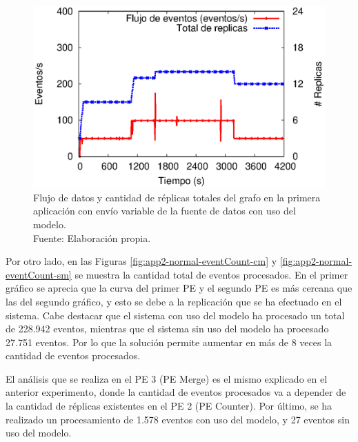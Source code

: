 \begin{figure}[!ht]
	\centering
	\captionsetup{justification=centering}
	\includegraphics[scale=0.7]{images/exp/app2/normal/cm/processSystem.eps}
    \caption[Flujo de datos y cantidad de réplicas totales del grafo en la primera aplicación con envío variable de la fuente de datos con uso del modelo.]{Flujo de datos y cantidad de réplicas totales del grafo en la primera aplicación con envío variable de la fuente de datos con uso del modelo.\\Fuente: Elaboración propia.}
	\label{fig:app2-normal-processSystem-cm}
\end{figure}


Por otro lado, en las Figuras \ref{fig:app2-normal-eventCount-cm} y \ref{fig:app2-normal-eventCount-sm} se muestra la cantidad total de eventos procesados. En el primer gráfico se aprecia que la curva del primer PE y el segundo PE es más cercana que las del segundo gráfico, y esto se debe a la replicación que se ha efectuado en el sistema. Cabe destacar que el sistema con uso del modelo ha procesado un total de 228.942 eventos, mientras que el sistema sin uso del modelo ha procesado 27.751 eventos. Por lo que la solución permite aumentar en más de 8 veces la cantidad de eventos procesados.

El análisis que se realiza en el PE 3 (PE Merge) es el mismo explicado en el anterior experimento, donde la cantidad de eventos procesados va a depender de la cantidad de réplicas existentes en el PE 2 (PE Counter). Por último, se ha realizado un procesamiento de 1.578 eventos con uso del modelo, y 27 eventos sin uso del modelo.

